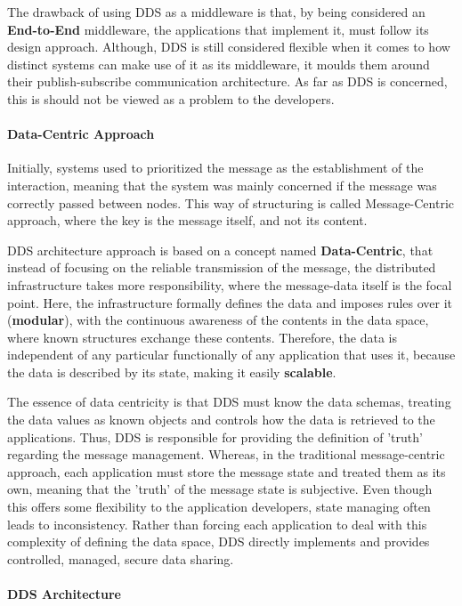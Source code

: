 The drawback of using DDS as a middleware is that, by being considered an \textbf{End-to-End} middleware, the applications that implement it, must follow its design approach. Although, DDS is still considered flexible when it comes to how distinct systems can make use of it as its middleware, it moulds them around their publish-subscribe communication architecture. As far as DDS is concerned, this is should not be viewed as a problem to the developers.

\paragraph{Data-Centric Approach}

Initially, systems used to prioritized the message as the establishment of the interaction, meaning that the system was mainly concerned if the message was correctly passed between nodes. This way of structuring is called Message-Centric approach, where the key is the message itself, and not its content.
            
DDS architecture approach is based on a concept named \textbf{Data-Centric}, that instead of focusing on the reliable transmission of the message, the distributed infrastructure takes more responsibility, where the message-data itself is the focal point. Here, the infrastructure formally defines the data and imposes rules over it (\textbf{modular}), with the continuous awareness of the contents in the data space, where known structures exchange these contents. Therefore, the data is independent of any particular functionally of any application that uses it, because the data is described by its state, making it easily \textbf{scalable}.
    
The essence of data centricity is that DDS must know the data schemas, treating the data values as known objects and controls how the data is retrieved to the applications. Thus, DDS is responsible for providing the definition of 'truth' regarding the message management.  Whereas, in the traditional message-centric approach, each application must store the message state and treated them as its own, meaning that the 'truth' of the message state is subjective. Even though this offers some flexibility to the application developers, state managing often leads to inconsistency. Rather than forcing each application to deal with this complexity of defining the data space, DDS directly implements and provides controlled, managed, secure data sharing.

\paragraph{DDS Architecture}

